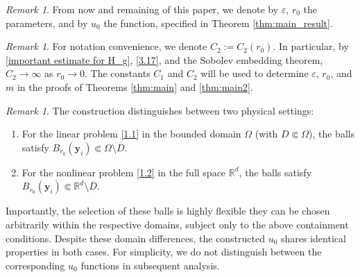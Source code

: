 \documentclass[11pt,reqno,oneside]{amsart}
\numberwithin{equation}{section}
\theoremstyle{definition}
\theoremstyle{remark}
\newtheorem{remark}[theorem]{Remark}
\numberwithin{equation}{section}
\begin{document}
	\begin{remark}\label{cf 3.5}
		From now and remaining of this paper, we denote by $\varepsilon$, $r_0$ the parameters, and by $u_0$ the function, specified in Theorem \ref{thm:main_result}.
	\end{remark}
	
	\begin{remark}\label{remark 3.2}
		For notation convenience, we denote $C_2 := C_2(r_0)$. In particular, by \eqref{important estimate for H_g}, \eqref{3.17}, and the Sobolev embedding theorem, $C_2 \to \infty$ as $r_0 \to 0$. The constants $C_1$ and $C_2$ will be used to determine $\varepsilon$, $r_0$, and $m$ in the proofs of Theorems \ref{thm:main} and \ref{thm:main2}.
	\end{remark}
	
	\begin{remark}
		The construction distinguishes between two physical settings:
		\begin{enumerate}
			\renewcommand{\labelenumi}{(\roman{enumi})}
			\item For the linear problem \eqref{1.1} in the bounded domain $\Omega$ (with $D \Subset \Omega$), the balls satisfy $B_{r_0}(\mathbf{y}_i) \Subset \Omega \setminus \overline{D}$.
			\item For the nonlinear problem \eqref{1.2} in the full space $\mathbb{R}^d$, the balls satisfy $B_{r_0}(\mathbf{y}_i) \Subset \mathbb{R}^d \setminus \overline{D}$.
		\end{enumerate}
		Importantly, the selection of these balls is highly flexible they can be chosen arbitrarily within the respective domains, subject only to the above containment conditions. Despite these domain differences, the constructed $u_0$ shares identical properties in both cases. For simplicity, we do not distinguish between the corresponding $u_0$ functions in subsequent analysis.
	\end{remark}
	
\end{document}
